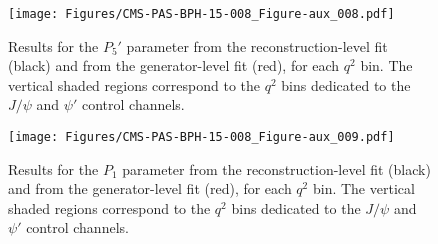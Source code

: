 \begin{figure}[!hbt]
  \centering
  \texttt{[image: Figures/CMS-PAS-BPH-15-008\_Figure-aux\_008.pdf]}
  \caption{Results for the $P_5'$ parameter from the reconstruction-level fit (black) and from the generator-level fit (red), for each $q^2$ bin.
    The vertical shaded regions correspond to the $q^2$ bins dedicated to the $J/\psi$ and $\psi'$ control channels.}
  \label{fig:fullreco-closure-p5p}
\end{figure}


\begin{figure}[!hbt]
  \centering
  \texttt{[image: Figures/CMS-PAS-BPH-15-008\_Figure-aux\_009.pdf]}
  \caption{Results for the $P_1$ parameter from the reconstruction-level fit (black) and from the generator-level fit (red), for each $q^2$ bin.
    The vertical shaded regions correspond to the $q^2$ bins dedicated to the $J/\psi$ and $\psi'$ control channels.}
  \label{fig:fullreco-closure-p1}
\end{figure}







